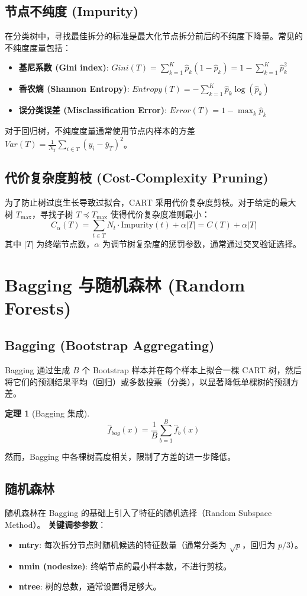 \documentclass[UTF8]{ctexart}
\newtheorem{theorem}{定理}
\begin{document}
\subsection{节点不纯度 (Impurity)}
在分类树中，寻找最佳拆分的标准是最大化节点拆分前后的不纯度下降量。常见的不纯度度量包括：
\begin{itemize}
    \item \textbf{基尼系数 (Gini index)}: $Gini(T) = \sum_{k=1}^K \hat{p}_k(1 - \hat{p}_k) = 1 - \sum_{k=1}^K \hat{p}_k^2$
    \item \textbf{香农熵 (Shannon Entropy)}: $Entropy(T) = - \sum_{k=1}^K \hat{p}_k \log(\hat{p}_k)$
    \item \textbf{误分类误差 (Misclassification Error)}: $Error(T) = 1 - \max_{k} \hat{p}_k$
\end{itemize}
对于回归树，不纯度度量通常使用节点内样本的方差 $Var(T) = \frac{1}{N_T} \sum_{i \in T} (y_i - \bar{y}_T)^2$。

\subsection{代价复杂度剪枝 (Cost-Complexity Pruning)}
为了防止树过度生长导致过拟合，CART 采用代价复杂度剪枝。对于给定的最大树 $T_{\max}$，寻找子树 $T \preceq T_{\max}$ 使得代价复杂度准则最小：
$$ C_\alpha(T) = \sum_{t \in T} N_t \cdot \text{Impurity}(t) + \alpha |T| = C(T) + \alpha|T| $$
其中 $|T|$ 为终端节点数，$\alpha$ 为调节树复杂度的惩罚参数，通常通过交叉验证选择。

\section{Bagging 与随机森林 (Random Forests)}

\subsection{Bagging (Bootstrap Aggregating)}
Bagging 通过生成 $B$ 个 Bootstrap 样本并在每个样本上拟合一棵 CART 树，然后将它们的预测结果平均（回归）或多数投票（分类），以显著降低单棵树的预测方差。
\begin{theorem}[Bagging 集成]
$$ \hat{f}_{bag}(x) = \frac{1}{B} \sum_{b=1}^B \hat{f}_b(x) $$
\end{theorem}
然而，Bagging 中各棵树高度相关，限制了方差的进一步降低。

\subsection{随机森林}
随机森林在 Bagging 的基础上引入了特征的随机选择（Random Subspace Method）。
\textbf{关键调参参数}：
\begin{itemize}
    \item \textbf{mtry}: 每次拆分节点时随机候选的特征数量（通常分类为 $\sqrt{p}$，回归为 $p/3$）。
    \item \textbf{nmin (nodesize)}: 终端节点的最小样本数，不进行剪枝。
    \item \textbf{ntree}: 树的总数，通常设置得足够大。
\end{itemize}
\end{document}
